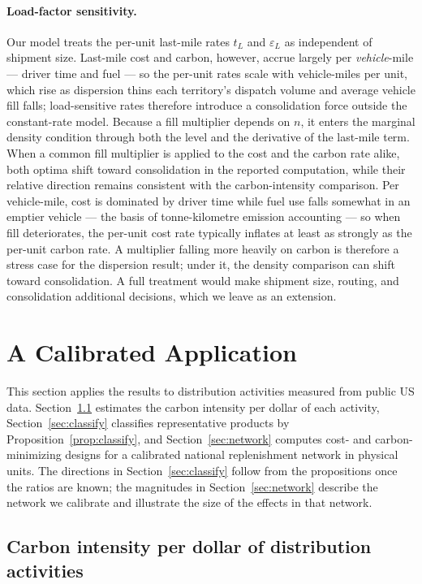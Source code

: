 \documentclass[11pt]{article}
\theoremstyle{definition}
\theoremstyle{remark}
\theoremstyle{plain}
\begin{document}
\paragraph{Load-factor sensitivity.} Our model treats the per-unit last-mile rates $t_L$ and $\varepsilon_L$
as independent of shipment size. Last-mile cost and carbon, however, accrue largely per \emph{vehicle}-mile
--- driver time and fuel --- so the per-unit rates scale with vehicle-miles per unit, which rise as
dispersion thins each territory's dispatch volume and average vehicle fill falls; load-sensitive rates therefore
introduce a consolidation force outside the constant-rate model. Because a fill multiplier depends on $n$,
it enters the marginal density condition through both the level and the derivative of the last-mile term.
When a common fill multiplier is applied to the cost and the carbon rate alike, both optima shift toward
consolidation in the reported computation, while their relative direction remains consistent with the
carbon-intensity comparison. Per vehicle-mile, cost is dominated by driver time while fuel use falls somewhat in an
emptier vehicle --- the basis of tonne-kilometre emission accounting \citep{glec2022framework} --- so when
fill deteriorates, the per-unit cost rate typically inflates at least as strongly as the per-unit carbon
rate. A multiplier falling more heavily on carbon is therefore a stress case for the dispersion result; under
it, the density comparison can shift toward consolidation. A full treatment would make shipment size, routing,
and consolidation additional decisions, which we leave as an extension.
\section{A Calibrated Application}\label{sec:numerical}

This section applies the results to distribution activities measured from public US data.
Section~\ref{sec:calib} estimates the carbon intensity per dollar of each activity,
Section~\ref{sec:classify} classifies representative products by Proposition~\ref{prop:classify}, and
Section~\ref{sec:network} computes cost- and carbon-minimizing designs for a calibrated national
replenishment network in physical units. The directions in Section~\ref{sec:classify} follow from the
propositions once the ratios are known; the magnitudes in Section~\ref{sec:network} describe the network we
calibrate and illustrate the size of the effects in that network.

\subsection{Carbon intensity per dollar of distribution activities}\label{sec:calib}
\end{document}
